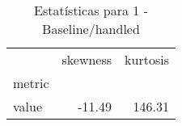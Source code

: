\begin{table}[htbp]
\caption{Estatísticas para 1 - Baseline/handled}
\label{tab:1_-_baseline_handled_skewkurt}
\begin{tabular}{lrr}
\toprule
 & skewness & kurtosis \\
metric &  &  \\
\midrule
value & -11.49 & 146.31 \\
\bottomrule
\end{tabular}
\end{table}
